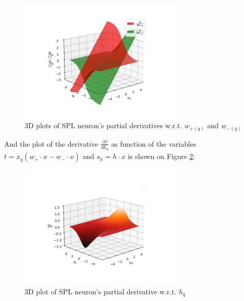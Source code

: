 \documentclass[sn-apa]{sn-jnl}%
\begin{document}
\begin{figure}[H]
\centering
\includegraphics[width=0.7\textwidth]{Fig5.png}
\caption{3D plots of SPL neuron's partial derivatives w.r.t. $w_{+(q)}$ and $w_{-(q)}$}\label{fig5}
\end{figure}

And the plot of the derivative $\frac{\partial f}{\partial h_q}$ as function of the variables $t=x_q(w_+ \cdot x - w_- \cdot x)$ and $s_h=h \cdot x$ is shown on Figure \ref{fig6}:

\begin{figure}[H]
\centering
\includegraphics[width=0.7\textwidth]{Fig6.png}
\caption{3D plot of SPL neuron's partial derivative w.r.t. $h_q$}\label{fig6}
\end{figure}
\end{document}

